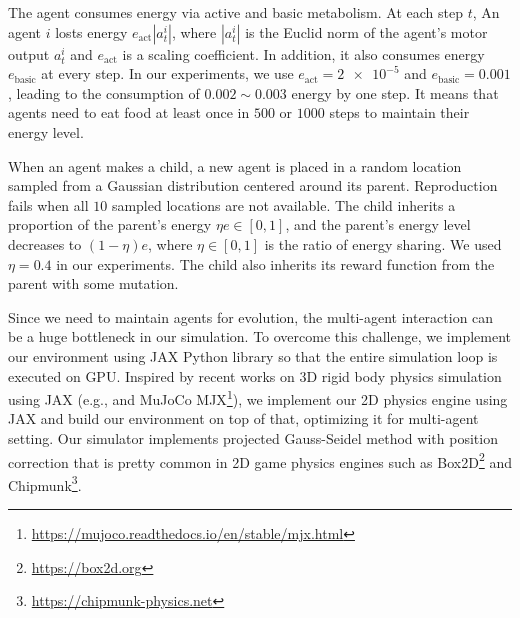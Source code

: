 The agent consumes energy via active and basic metabolism. At each step $t$, An agent $i$ losts energy $e_{\mathrm{act}} |a_{t}^{i}|$, where $|a_{t}^{i}|$ is the Euclid norm of the agent's motor output $a_{t}^{i}$ and $e_{\mathrm{act}}$ is a scaling coefficient. In addition, it also consumes energy $e_{\mathrm{basic}}$ at every step. In our experiments, we use $e_{\mathrm{act}} = \num{2e-5}$ and $e_{\mathrm{basic}} = 0.001$, leading to the consumption of $0.002 \sim 0.003$ energy by one step. It means that agents need to eat food at least once in $500$ or $1000$ steps to maintain their energy level.

When an agent makes a child, a new agent is placed in a random location sampled from a Gaussian distribution centered around its parent. Reproduction fails when all $10$ sampled locations are not available. The child inherits a proportion of the parent's energy $\eta e \in [0, 1]$, and the parent's energy level decreases to $(1-\eta)e$, where $\eta \in [0, 1]$ is the ratio of energy sharing. We used $\eta = 0.4$ in our experiments. The child also inherits its reward function from the parent with some mutation.

Since we need to maintain agents for evolution, the multi-agent interaction can be a huge bottleneck in our simulation. To overcome this challenge, we implement our environment using JAX Python library \citep{jax2018github} so that the entire simulation loop is executed on GPU. Inspired by recent works on 3D rigid body physics simulation using JAX (e.g., \citet{brax2021github} and MuJoCo \citep{todorov2012mujoco} MJX\footnote{\url{https://mujoco.readthedocs.io/en/stable/mjx.html}}), we implement our 2D physics engine using JAX and build our
environment on top of that, optimizing it for multi-agent setting. Our simulator implements projected Gauss-Seidel method with position correction \citep{catto2005iterative} that is pretty common in 2D game physics engines such as Box2D\footnote{\url{https://box2d.org}} and Chipmunk\footnote{\url{https://chipmunk-physics.net}}.

